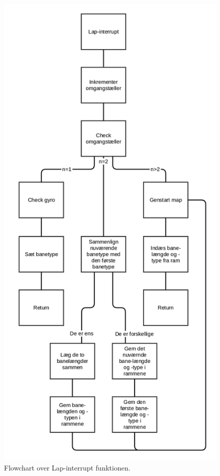 \begin{figure}
\centering
\includegraphics[scale=0.12]{Billeder/lap_interrupt.png}
\caption{Flowchart over Lap-interrupt funktionen.}
\label{fig:Lap Flowchart}
\end{figure}